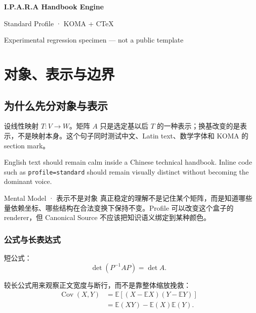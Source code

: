 \documentclass[
  11pt,
  a4paper,
  open=any,
  headinclude=true,
  footinclude=false,
  headheight=18pt,
  footheight=18pt,
  DIV=11
]{scrbook}
\begin{document}
\frontmatter
\begin{titlepage}
  \centering
  \vspace*{0.18\textheight}
  {\Huge\bfseries\sffamily I.P.A.R.A Handbook Engine\par}
  \vspace{0.7em}
  {\Large Standard Profile · KOMA + CTeX\par}
  \vspace{1.5em}
  {\small Experimental regression specimen — not a public template\par}
\end{titlepage}

\tableofcontents

\mainmatter
\chapter{对象、表示与边界}

\section{为什么先分对象与表示}

设线性映射 $T\colon V\to W$。矩阵 $A$ 只是选定基以后 $T$ 的一种表示；换基改变的是表示，不是映射本身。这个句子同时测试中文、Latin text、数学字体和 KOMA 的 section mark。

English text should remain calm inside a Chinese technical handbook. Inline code such as \texttt{profile=standard} should remain visually distinct without becoming the dominant voice.

\begin{specimenbox}{Mental Model · 表示不是对象}
真正稳定的理解不是记住某个矩阵，而是知道哪些量依赖坐标、哪些结构在合法变换下保持不变。Profile 可以改变这个盒子的 renderer，但 Canonical Source 不应该把知识语义绑定到某种颜色。
\end{specimenbox}

\subsection{公式与长表达式}

短公式：
\[
  \det(P^{-1}AP)=\det A.
\]

较长公式用来观察正文宽度与断行，而不是靠整体缩放挽救：
\begin{align}
  \operatorname{Cov}(X,Y)
  &= \mathbb E\!\left[(X-\mathbb EX)(Y-\mathbb EY)\right] \\
  &= \mathbb E(XY)-\mathbb E(X)\mathbb E(Y).
\end{align}
\end{document}

